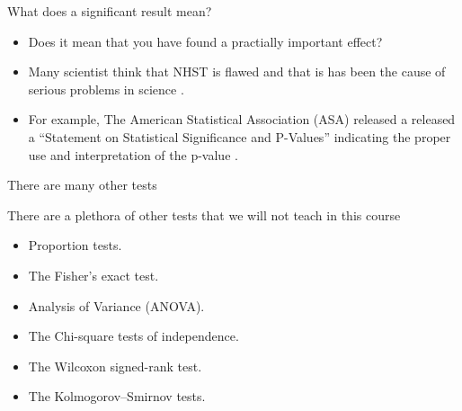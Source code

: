 \documentclass[handout]{beamer}
\begin{document}
\begin{frame}{What does a significant result mean?}
\scriptsize{
\begin{itemize}

 \item  Does it mean that you have found a practially important effect?
\item  Many scientist think that NHST is flawed and that is has been the cause of serious problems in science \cite{poldrack2019statistical}.

 \item For example, The American Statistical Association (ASA) released a released a ``Statement on Statistical Significance and P-Values'' indicating the proper use and interpretation of the p-value \cite{wasserstein2016asa}.
 
\end{itemize}
}
 
\end{frame}


\begin{frame}{There are many other tests}
 \scriptsize{
There are a plethora of other tests that we will not teach in this course
 
\begin{itemize}
 \item Proportion tests.
 \item The Fisher's exact test.
 \item Analysis of Variance (ANOVA).
 \item The Chi-square tests of independence.
 \item The Wilcoxon signed-rank test.
 \item The Kolmogorov–Smirnov tests. 
 
\end{itemize}


}
\end{frame}
\end{document}
